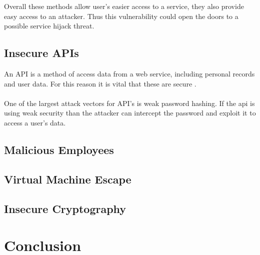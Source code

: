 Overall these methods allow user's easier access to a service, they also provide easy access to an attacker. Thus this vulnerability could open the doors to a possible service hijack threat.

\subsection{Insecure APIs}
An API is a method of access data from a web service, including personal records and user data. For this reason it is vital that these are secure \cite{lu_keeping_2014}.\\
\\
One of the largest attack vectors for API's is weak password hashing. If the api is using weak security than the attacker can intercept the password and exploit it to access a user's data.

\subsection{Malicious Employees}

\subsection{Virtual Machine Escape}

\subsection{Insecure Cryptography}

\section{Conclusion}
